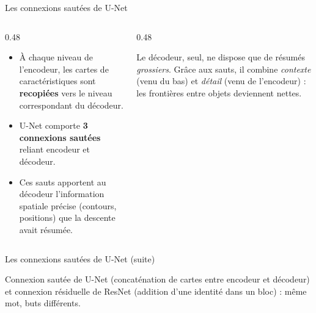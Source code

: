 \begin{frame}{Les connexions sautées de U-Net}
\begin{columns}[t]
\begin{column}{0.48\textwidth}
\begin{itemize}
  \item À chaque niveau de l'encodeur, les cartes de caractéristiques sont
  \textbf{recopiées} vers le niveau correspondant du décodeur.
  \item U-Net comporte \textbf{3 connexions sautées} reliant encodeur
  et décodeur.
  \item Ces sauts apportent au décodeur l'information spatiale précise
  (contours, positions) que la descente avait résumée.
\end{itemize}
\end{column}
\begin{column}{0.48\textwidth}
\begin{kbox}
Le décodeur, seul, ne dispose que de résumés \emph{grossiers}. Grâce aux sauts,
il combine \emph{contexte} (venu du bas) et \emph{détail} (venu de l'encodeur) :
les frontières entre objets deviennent nettes.
\end{kbox}

\end{column}
\end{columns}
\end{frame}
\begin{frame}{Les connexions sautées de U-Net (suite)}
\begin{wbox}
Connexion sautée de U-Net (concaténation de cartes entre encodeur et décodeur)
et connexion résiduelle de ResNet (addition d'une identité dans un bloc) :
même mot, buts différents.
\end{wbox}
\end{frame}
